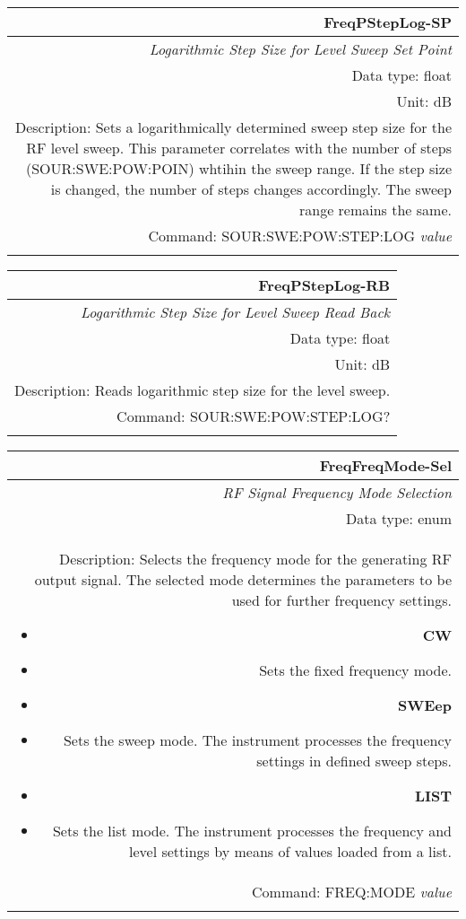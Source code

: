 \documentclass[openany]{article}
\begin{document}
		\begin{tabular}{N}
			\hline
			\bfseries FreqPStepLog-SP \\ \hline
			\emph{Logarithmic Step Size for Level Sweep Set Point} \\
			Data type: float \\
			Unit: dB \\ 
			Description: Sets a logarithmically determined sweep step size for the RF level sweep. This parameter correlates with the number of steps (SOUR:SWE:POW:POIN) whtihin the sweep range. If the step size is changed, the number of steps changes accordingly. The sweep range remains the same. \\
			Command: SOUR:SWE:POW:STEP:LOG \emph{value} \\
			\\
			
		\end{tabular}


		\begin{tabular}{N}
			\hline
			\bfseries FreqPStepLog-RB \\ \hline
			\emph{Logarithmic Step Size for Level Sweep Read Back} \\
			Data type: float \\
			Unit: dB \\
			Description: Reads logarithmic step size for the level sweep. \\
			Command: SOUR:SWE:POW:STEP:LOG? \\
			\\

		\end{tabular}


		\begin{tabular}{N}
			\hline
			\bfseries FreqFreqMode-Sel \\ \hline
			\emph{RF Signal Frequency Mode Selection} \\
			Data type: enum \\
			Description: Selects the frequency mode for the generating RF output signal. The selected mode determines the parameters to be used for further frequency settings.\begin{itemize}[noitemsep]
				\small
				\item[] \textbf{CW} 
				\item[] Sets the fixed frequency mode.
				\item[] \textbf{SWEep}
				\item[] Sets the sweep mode. The instrument processes the frequency settings in defined sweep steps.
				\item[] \textbf{LIST}
				\item[] Sets the list mode. The instrument processes the frequency and level settings by means of values loaded from a list.
			\end{itemize} \\
			Command: FREQ:MODE \emph{value} \\
			\\

		\end{tabular}
\end{document}
